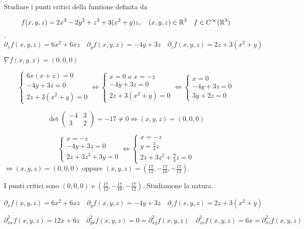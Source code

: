 \begin{exbar}
\begin{example}
	Studiare i punti critici della funzione definita da 
	
	$$f(x,y,z)=2x^3-2y^2+z^2+3(x^2+y)z, \quad (x,y,z)\in \mathbb{R}^3 \quad f\in C^\infty(\mathbb{R}^3)$$.\\
	
	$$\partial_xf(x,y,z)=6x^2+6xz \quad \partial_yf(x,y,z)=-4y+3z \quad \partial_zf(x,y,z)=2z+3(x^2+y)$$
	
	$\nabla f(x,y,z)=(0,0,0)$
	
	$$\begin{cases}
		6x(x+z)=0\\
		-4y+3z=0\\
		2z+3(x^2+y)=0
	\end{cases}\Leftrightarrow
	\begin{cases}
		x=0\text{  o  }x=-z\\
		-4y+3z=0\\
		2z+3(x^2+y)=0
	\end{cases}\Leftrightarrow
	\begin{cases}
		x=0\\
		-4y+3z=0\\
		3y+2z=0
	\end{cases}$$
	
	$$\det\begin{pmatrix}
		-4&3\\
		3&2
	\end{pmatrix}=-17\neq 0 \Leftrightarrow (x,y,z)=(0,0,0)$$
	
	$$\begin{cases}
		x=-z\\
		-4y+3z=0\\
		2z+3z^2+3y=0
	\end{cases}\Leftrightarrow
	\begin{cases}
		x=-z\\
		y=\frac{3}{4}z\\
		2z+3z^2+\frac{9}{4}z=0
	\end{cases}$$
	$\Leftrightarrow (x,y,z)=(0,0,0)$ oppure $(x,y,z)=(\frac{17}{12},-\frac{17}{16},-\frac{17}{12})$.
	
	I punti critici sono $(0,0,0)$ e $(\frac{17}{12},-\frac{17}{16},-\frac{17}{12})$. Studiamone la natura.
	
	$$\partial_xf(x,y,z)=6x^2+6xz \quad \partial_yf(x,y,z)=-4y+3z \quad \partial_zf(x,y,z)=2z+3(x^2+y)$$
	
	$$\partial_{xx}^2f(x,y,z)=12x+6z \quad \partial_{yx}^2f(x,y,z)=0=\partial_{xy}^2f(x,y,z) \quad \partial_{zx}^2f(x,y,z)=6x=\partial_{xz}^2f(x,y,z)$$
	

\end{example}
\end{exbar}
